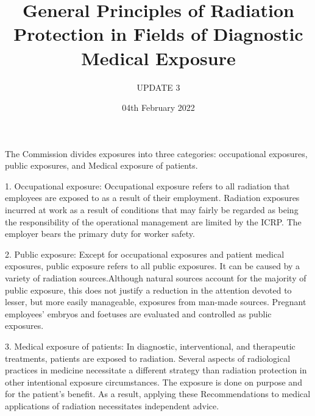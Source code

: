 \documentclass[12pt]{article}
\title{ General Principles of Radiation Protection in Fields of Diagnostic Medical Exposure}
\author{UPDATE 3}
\date{04th February 2022}
\begin{document}
\maketitle
The Commission divides exposures into three categories: occupational exposures, public exposures, and  Medical exposure of patients.

1. Occupational exposure: Occupational exposure refers to all radiation that employees are exposed to as a result of their employment. Radiation exposures incurred at work as a result of conditions that may fairly be regarded as being the responsibility of the operational management are limited by the ICRP. The employer bears the primary duty for worker safety.

2. Public exposure: Except for occupational exposures and patient medical exposures, public exposure refers to all public exposures. It can be caused by a variety of radiation sources.Although natural sources account for the majority of public exposure, this does not justify a reduction in the attention devoted to lesser, but more easily manageable, exposures from man-made sources. Pregnant employees' embryos and foetuses are evaluated and controlled as public exposures.

3. Medical exposure of patients: In diagnostic, interventional, and therapeutic treatments, patients are exposed to radiation. Several aspects of radiological practices in medicine necessitate a different strategy than radiation protection in other intentional exposure circumstances. The exposure is done on purpose and for the patient's benefit. As a result, applying these Recommendations to medical applications of radiation necessitates independent advice.
\end{document}
